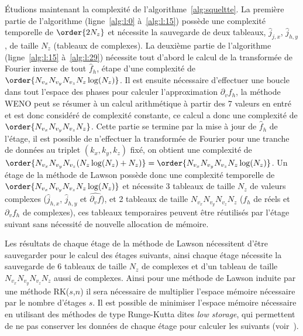 Étudions maintenant la complexité de l'algorithme~\ref{alg:squeltte}. La première partie de l'algorithme (ligne~\ref{alg:l:0} à~\ref{alg:l:15}) possède une complexité temporelle de $\order{2N_z}$ et nécessite la sauvegarde de deux tableaux, $\hat{j}_{j,x}$, $\hat{j}_{h,y}$, de taille $N_z$ (tableaux de complexes). La deuxième partie de l'algorithme (ligne~\ref{alg:l:15} à~\ref{alg:l:29}) nécessite tout d'abord le calcul de la transformée de Fourier inverse de tout $\hat{f}_h$, étape d'une complexité de $\order{N_{v_x}N_{v_y}N_{v_z}N_z\log(N_z)}$. Il est ensuite nécessaire d'effectuer une boucle dans tout l'espace des phases pour calculer l'approximation $\partial_vf_h$, la méthode WENO peut se résumer à un calcul arithmétique à partir des 7 valeurs en entré et est donc considéré de complexité constante, ce calcul a donc une complexité de $\order{N_{v_x}N_{v_y}N_{v_z}N_z}$. Cette partie se termine par la mise à jour de $\hat{f}_h$ de l'étage, il est possible de n'effectuer la transformée de Fourier pour une tranche de données au triplet $(k_x,k_y,k_z)$ fixé, on obtient une complexité de $\order{N_{v_x}N_{v_y}N_{v_z}(N_z\log(N_z)+N_z)} = \order{N_{v_x}N_{v_y}N_{v_z}N_z\log(N_z)}$. Un étage de la méthode de Lawson possède donc une complexité temporelle de $\order{N_{v_x}N_{v_y}N_{v_z}N_z\log(N_z)}$ et nécessite 3 tableaux de taille $N_z$ de valeurs complexes ($\hat{j}_{h,x}$, $\hat{j}_{h,y}$ et $\widehat{\partial_vf}$), et 2 tableaux de taille $N_{v_x}N_{v_y}N_{v_z}N_z$ ($f_h$ de réels et $\partial_vf_h$ de complexes), ces tableaux temporaires peuvent être réutilisés par l'étage suivant sans nécessité de nouvelle allocation de mémoire.

Les résultats de chaque étage de la méthode de Lawson nécessitent d'être sauvegarder pour le calcul des étages suivants, ainsi chaque étage nécessite la sauvegarde de 6 tableaux de taille $N_z$ de complexes et d'un tableau de taille $N_{v_x}N_{v_y}N_{v_z}N_z$ aussi de complexes. Ainsi pour une méthode de Lawson induite par une méthode RK($s$,$n$) il sera nécessaire de multiplier l'espace mémoire nécessaire par le nombre d'étages $s$. Il est possible de minimiser l'espace mémoire nécessaire en utilisant des méthodes de type Runge-Kutta dites \emph{low storage}, qui permettent de ne pas conserver les données de chaque étage pour calculer les suivants (voir~\cite{Ketcheson:2015}).

